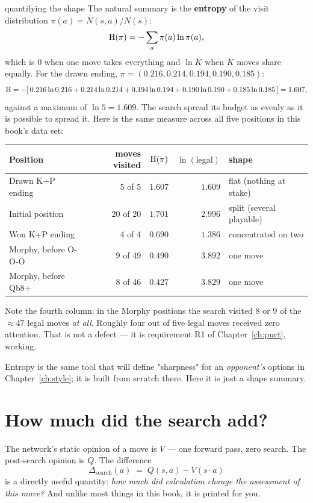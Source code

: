 \begin{worked}{quantifying the shape}
The natural summary is the \textbf{entropy} of the visit distribution
$\pi(a) = N(s,a)/N(s)$:
\[
  \operatorname{H}(\pi) = -\sum_a \pi(a)\ln \pi(a) ,
\]
which is $0$ when one move takes everything and $\ln K$ when $K$ moves share equally. For the
drawn ending, $\pi = (0.216, 0.214, 0.194, 0.190, 0.185)$:
\[
\operatorname{H} = -[\,0.216\ln 0.216 + 0.214\ln 0.214 + 0.194\ln 0.194 + 0.190\ln 0.190 + 0.185\ln 0.185\,]
= 1.607,
\]
against a maximum of $\ln 5 = 1.609$. The search spread its budget as evenly as it is
possible to spread it. Here is the same measure across all five positions in this book's
data set:
\begin{center}
\begin{tabular}{@{}lrrrl@{}}
\toprule
Position & moves visited & $\operatorname{H}(\pi)$ & $\ln(\text{legal})$ & shape \\
\midrule
Drawn K+P ending      & 5 of 5   & $1.607$ & $1.609$ & flat (nothing at stake) \\
Initial position      & 20 of 20 & $1.701$ & $2.996$ & split (several playable) \\
Won K+P ending        & 4 of 4   & $0.690$ & $1.386$ & concentrated on two \\
Morphy, before O-O-O  & 9 of 49  & $0.490$ & $3.892$ & one move \\
Morphy, before Qb8+   & 8 of 46  & $0.427$ & $3.829$ & one move \\
\bottomrule
\end{tabular}
\end{center}
Note the fourth column: in the Morphy positions the search visited 8 or 9 of the $\approx 47$
legal moves \emph{at all}. Roughly four out of five legal moves received zero attention. That
is not a defect --- it is requirement R1 of Chapter~\ref{ch:puct}, working.

Entropy is the same tool that will define "sharpness" for an \emph{opponent's} options in
Chapter~\ref{ch:style}; it is built from scratch there. Here it is just a shape summary.
\end{worked}

\section{How much did the search add?}

The network's static opinion of a move is $V$ --- one forward pass, zero search. The
post-search opinion is $Q$. The difference
\begin{equation}
  \label{eq:searchgain}
  \Delta_{\text{search}}(a) \;=\; Q(s,a) - V(s\!\cdot\!a)
\end{equation}
is a directly useful quantity: \emph{how much did calculation change the assessment of this
move?} And unlike most things in this book, it is printed for you.


